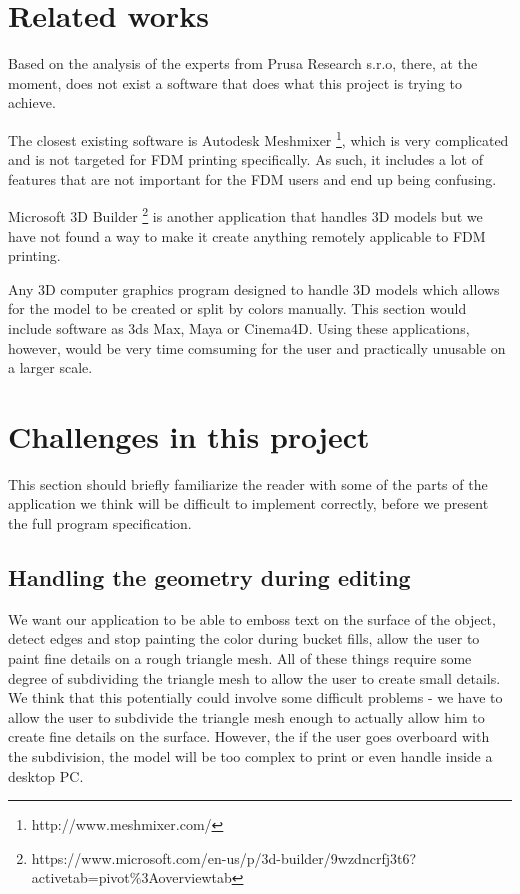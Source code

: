\section{Related works}

Based on the analysis of the experts from Prusa Research s.r.o, there, at the moment, does not exist a software that does what this project is trying to achieve.

The closest existing software is Autodesk Meshmixer \footnote{http://www.meshmixer.com/}, which is very complicated and is not targeted for FDM printing specifically. As such, it includes a lot of features that are not important for the FDM users and end up being confusing.

Microsoft 3D Builder \footnote{https://www.microsoft.com/en-us/p/3d-builder/9wzdncrfj3t6?activetab=pivot\%3Aoverviewtab} is another application that handles 3D models but we have not found a way to make it create anything remotely applicable to FDM printing.

Any 3D computer graphics program designed to handle 3D models which allows for the model to be created or split by colors manually. This section would include software as 3ds Max, Maya or Cinema4D. Using these applications, however, would be very time comsuming for the user and practically unusable on a larger scale.

\section{Challenges in this project}

This section should briefly familiarize the reader with some of the parts of the application we think will be difficult to implement correctly, before we present the full program specification.

\subsection{Handling the geometry during editing}

We want our application to be able to emboss text on the surface of the object, detect edges and stop painting the color during bucket fills, allow the user to paint fine details on a rough triangle mesh. All of these things require some degree of subdividing the triangle mesh to allow the user to create small details. We think that this potentially could involve some difficult problems - we have to allow the user to subdivide the triangle mesh enough to actually allow him to create fine details on the surface. However, the if the user goes overboard with the subdivision, the model will be too complex to print or even handle inside a desktop PC.

